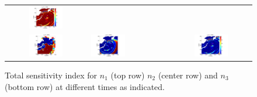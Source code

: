 \documentclass[review,12pt]{elsarticle}
\begin{document}
\begin{figure}[ht]
\begin{tabular}{clc}
\hspace*{-45pt}
\includegraphics[width=0.45\textwidth]{Figure11f.pdf} \\
\hspace*{-55pt}
\includegraphics[width=0.45\textwidth]{Figure11g.pdf} &
\hspace*{-45pt}
\includegraphics[width=0.45\textwidth]{Figure11h.pdf} &
\hspace*{-45pt}
\includegraphics[width=0.45\textwidth]{Figure11i.pdf}
\end{tabular}
\caption{Total sensitivity index for $n_1$ (top row) $n_2$ (center row) and $n_3$ (bottom row)
 at different times as indicated.}
\label{fig:sens2d}
\end{figure}
\end{document}
